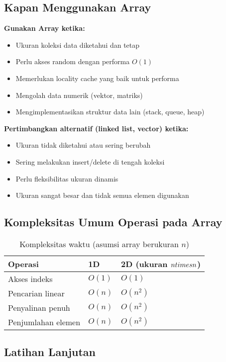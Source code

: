 \documentclass[../main.tex]{subfiles}
\begin{document}
\subsection{Kapan Menggunakan Array}

\textbf{Gunakan Array ketika:}
\begin{itemize}
  \item Ukuran koleksi data diketahui dan tetap
  \item Perlu akses random dengan performa \(O(1)\)
  \item Memerlukan locality cache yang baik untuk performa
  \item Mengolah data numerik (vektor, matriks)
  \item Mengimplementasikan struktur data lain (stack, queue, heap)
\end{itemize}

\textbf{Pertimbangkan alternatif (linked list, vector) ketika:}
\begin{itemize}
  \item Ukuran tidak diketahui atau sering berubah
  \item Sering melakukan insert/delete di tengah koleksi
  \item Perlu fleksibilitas ukuran dinamis
  \item Ukuran sangat besar dan tidak semua elemen digunakan
\end{itemize}

\subsection{Kompleksitas Umum Operasi pada Array}
\begin{table}[H]
  \centering
  \caption{Kompleksitas waktu (asumsi array berukuran $n$)}
  \begin{tabular}{@{}lll@{}}
    \toprule
    Operasi & 1D & 2D (ukuran $n\\times n$) \\
    \midrule
    Akses indeks & $O(1)$ & $O(1)$ \\
    Pencarian linear & $O(n)$ & $O(n^2)$ \\
    Penyalinan penuh & $O(n)$ & $O(n^2)$ \\
    Penjumlahan elemen & $O(n)$ & $O(n^2)$ \\
    \bottomrule
  \end{tabular}
\end{table}

\subsection{Latihan Lanjutan}
\end{document}
